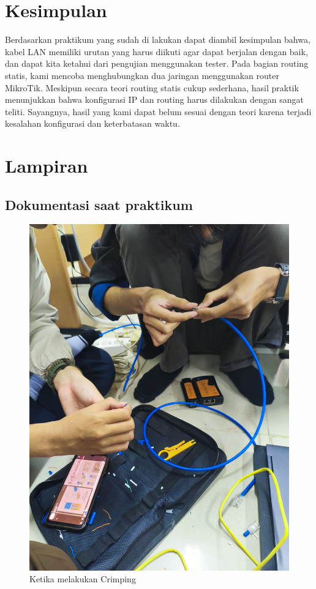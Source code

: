 \section{Kesimpulan}
Berdasarkan praktikum yang sudah di lakukan dapat diambil kesimpulan bahwa, kabel LAN memiliki urutan yang harus diikuti agar dapat berjalan dengan baik, dan dapat kita ketahui dari pengujian menggunakan tester. Pada bagian routing statis, kami mencoba menghubungkan dua jaringan menggunakan router MikroTik. Meskipun secara teori routing statis cukup sederhana, hasil praktik menunjukkan bahwa konfigurasi IP dan routing harus dilakukan dengan sangat teliti. Sayangnya, hasil yang kami dapat belum sesuai dengan teori karena terjadi kesalahan konfigurasi dan keterbatasan waktu.

\section{Lampiran}
\subsection{Dokumentasi saat praktikum}

\begin{figure}[H]
    \centering
    \includegraphics[width=0.5\linewidth]{P1/img/4.jpeg}
    \caption{Ketika melakukan Crimping}
    \label{fig:inirujukan}
  \end{figure}
  
